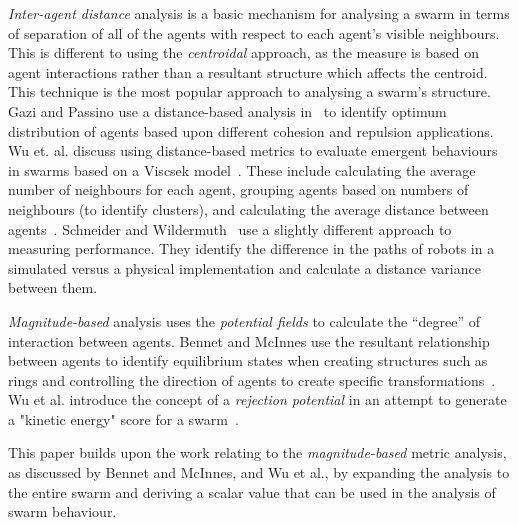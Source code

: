 \documentclass{ieeeaccess}
\begin{document}
\textit{Inter-agent distance} analysis is a basic mechanism for analysing a
swarm in terms of separation of all of the agents with respect to each agent's
visible neighbours. This is different to using the \textit{centroidal} approach,
as the measure is based on agent interactions rather than a resultant structure
which affects the centroid. This technique is the most popular approach to
analysing a swarm's structure. Gazi and Passino use a distance-based analysis
in~\cite{GP:04, GP:11} to identify optimum distribution of agents based upon
different cohesion and repulsion applications. Wu et. al. discuss using
distance-based metrics to evaluate emergent behaviours in swarms based on a
Viscsek model~\cite{WCW:11}. These include calculating the average number of
neighbours for each agent, grouping agents based on numbers of neighbours (to
identify clusters), and calculating the average distance between agents~\cite{WCW:11}.
Schneider and Wildermuth~\cite{SW:03} use a slightly different approach to
measuring performance. They identify the difference in the paths of robots in a
simulated versus a physical implementation and calculate a distance variance
between them.

\textit{Magnitude-based} analysis uses the \textit{potential fields} to
calculate the ``degree'' of interaction between agents. Bennet and McInnes use
the resultant relationship between agents to identify equilibrium states when
creating structures such as rings and controlling the direction of agents to
create specific transformations~\cite{BM:09}. Wu et al. introduce the concept
of a \textit{rejection potential} in an attempt to generate a "kinetic energy"
score for a swarm~\cite{WCW:11}.

This paper builds upon the work relating to the \textit{magnitude-based} metric
analysis, as discussed by Bennet and McInnes, and Wu et al., by expanding the
analysis to the entire swarm and deriving a scalar value that can be used in the
analysis of swarm behaviour.

\end{document}
